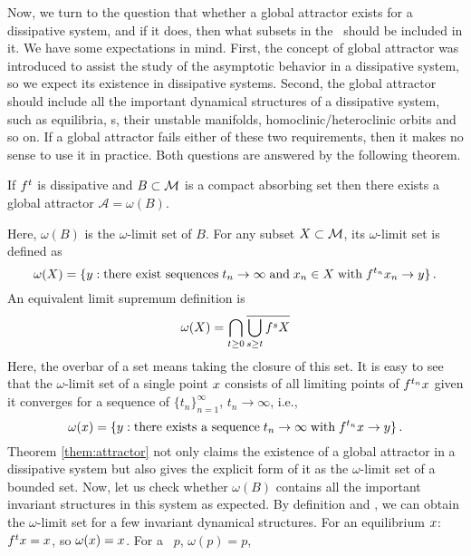 Now, we turn to the question that whether a global attractor exists
for a dissipative system, and
if it does, then what subsets in the \statesp\
should be included in it. We have
some expectations in mind. First,
the concept of global attractor was introduced to assist the
study of the asymptotic behavior in a
dissipative system, so we expect its existence in
dissipative systems.
Second, the global attractor should include all the important
dynamical structures of a dissipative system, such as equilibria,
\po s, their unstable manifolds, homoclinic/heteroclinic
orbits and so on. If a global attractor fails either of these
two requirements, then it makes no sense to use it in practice.
Both questions are answered by the following theorem.
\begin{theorem}
  If ${f^{t}}$ is dissipative and $B\subset \mathcal{M}$ is a compact absorbing
  set then there exists a global attractor $\mathcal{A} = \omega(B)$.
  \label{them:attractor}
\end{theorem}
Here, $\omega(B)$ is the $\omega$-limit set of $B$. For any
subset $X\subset \mathcal{M}$, its $\omega$-limit set is defined as
\begin{equation}
  \label{eq:omega}
  \omega(X) = \{y :
  \text{there exist sequences}\; t_n\to\infty\;\text{and}\; x_n\in X \;
  \text{with}\; {f^{t_n}}x_n\to y\}
  \,.
\end{equation}
An equivalent limit supremum definition is
\[
  \omega(X) = \bigcap_{t\ge 0}\overline{\bigcup_{s\ge t}{f^{s}}X}
\]
Here, the overbar of a set means taking the closure of this set.
It is easy to see
that the $\omega$-limit set of a single point $x$ consists
of all limiting points of ${f^{t_n}}x$
given it converges for a sequence of $\{t_n\}_{n=1}^\infty$,
$t_n\to\infty$,
i.e.,
\begin{equation}
  \omega(x) = \{y :
  \text{there exists a sequence}\; t_n\to\infty \;
  \text{with}\; {f^{t_n}}x \to y
  \}
  \,.
  \label{eq:omega2}
\end{equation}
Theorem \ref{them:attractor} not only claims the existence of a
global attractor in a dissipative system but also
gives the explicit form of it as the $\omega$-limit set of a bounded
set. Now, let us check whether $\omega(B)$ contains all the important
invariant structures in this system as expected.
By definition  and , we can obtain
the $\omega$-limit set for a few invariant
dynamical structures.
For an equilibrium $x$: ${f^{t}}x=x$, so
$\omega(x) = x$.
For a \po\ $p$, $\omega(p) = p$,
